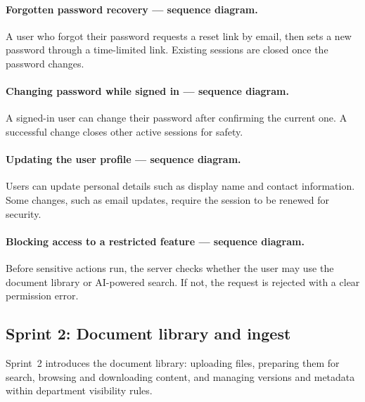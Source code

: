 \paragraph{Forgotten password recovery --- sequence diagram.}
A user who forgot their password requests a reset link by email, then sets a new
password through a time-limited link. Existing sessions are closed once the
password changes.

\paragraph{Changing password while signed in --- sequence diagram.}
A signed-in user can change their password after confirming the current one.
A successful change closes other active sessions for safety.


\paragraph{Updating the user profile --- sequence diagram.}
Users can update personal details such as display name and contact information.
Some changes, such as email updates, require the session to be renewed for
security.

\paragraph{Blocking access to a restricted feature --- sequence diagram.}
Before sensitive actions run, the server checks whether the user may use the
document library or AI-powered search. If not, the request is rejected with a
clear permission error.

\subsection{Sprint 2: Document library and ingest}\label{subsec:sprint2-design}

Sprint~2 introduces the document library: uploading files, preparing them for
search, browsing and downloading content, and managing versions and metadata
within department visibility rules.

